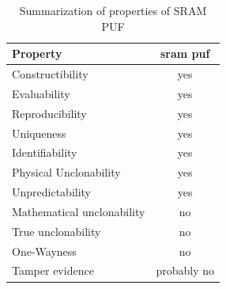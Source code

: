 \begin{table}[ht!]
\centering
\begin{tabular}{l c} 
    \textbf{Property} & \textbf{\gls{sram} \gls{puf}} \\
     \toprule
    Constructibility & yes\\ 
    Evaluability & yes\\
    Reproducibility & yes\\
    Uniqueness & yes\\
    Identifiability & yes\\ 
    Physical Unclonability & yes\\
    Unpredictability & yes\\
    Mathematical unclonability & no\\
    True unclonability & no\\
    One-Wayness & no\\
    Tamper evidence & probably no\\
     \bottomrule
    \end{tabular}
    \captionsetup{justification=centering,margin=0.5cm}
    \caption{Summarization of properties of SRAM PUF}
    \label{table:sram_puf_properties}
\end{table}


